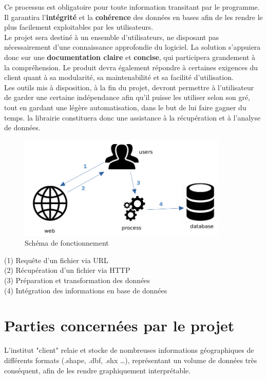 \documentclass[french,12pt]{report}
\begin{document}
\begin{normalsize}
Ce processus est obligatoire pour toute information transitant par le programme. Il garantira l’\textbf{intégrité} et la \textbf{cohérence} des données en bases afin de les rendre le plus facilement exploitables par les utilisateurs.
\\

Le projet sera destiné à un ensemble d’utilisateurs, ne disposant pas nécessairement d'une connaissance approfondie du logiciel. La solution s’appuiera donc sur une \textbf{documentation claire} et \textbf{concise}, qui participera grandement à la compréhension. Le produit devra également répondre à certaines exigences du client quant à sa modularité, sa maintenabilité et sa facilité d’utilisation.\\

Les outils mis à disposition, à la fin du projet, devront permettre à l’utilisateur de garder une certaine indépendance afin qu’il puisse les utiliser selon son gré, tout en gardant une légère automatisation, dans le but de lui faire gagner du temps. la librairie constituera donc une assistance à la récupération et à l’analyse de données.  
\begin{figure}[h]
	\centerline{\includegraphics[width=10cm]{diagram.png}}
	\caption{Schéma de fonctionnement}
 \end{figure}

\begin{scriptsize}
\noindent (1) Requête d'un fichier via URL\\
(2) Récupération d'un fichier via HTTP\\
(3) Préparation et transformation des données\\
(4) Intégration des informations en base de données
\end{scriptsize}

   \section{Parties concernées par le projet}
   L’institut "client" relaie et stocke de nombreuses informations géographiques de différents formats (.shape, .dbf, .shx …), représentant un volume de données très conséquent, afin de les rendre graphiquement interprétable.
\\


\end{normalsize}
\end{document}
